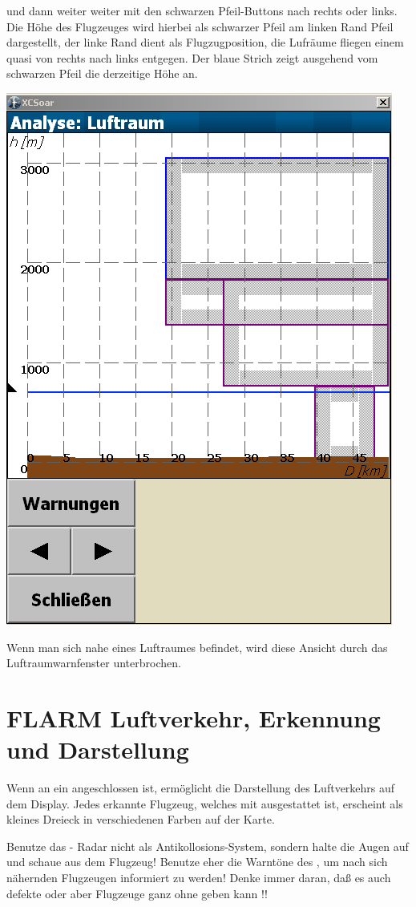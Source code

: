 und dann weiter weiter mit den schwarzen Pfeil-Buttons  nach rechts oder links.
Die Höhe des Flugzeuges wird hierbei als schwarzer Pfeil am linken Rand Pfeil dargestellt, der linke
Rand dient als Flugzugposition, die Lufräume fliegen einem quasi von rechts nach links entgegen.
Der blaue Strich zeigt ausgehend vom schwarzen Pfeil die derzeitige Höhe an.

\begin{center}
\includegraphics[angle=0,width=0.7\linewidth,keepaspectratio='true']{figures/analysis-airspace.png}
\end{center}

Wenn man sich nahe eines Luftraumes befindet, wird diese Ansicht durch das
Luftraumwarnfenster unterbrochen.


\section{FLARM Luftverkehr, Erkennung und Darstellung}
Wenn \xc an ein \fl angeschlossen ist, ermöglicht \xc die Darstellung
des Luftverkehrs auf dem Display. Jedes erkannte Flugzeug, welches mit \fl
ausgestattet ist,  erscheint als kleines Dreieck in verschiedenen Farben  auf der Karte.

\achtung Benutze das \xc \fl- Radar nicht als Antikollosions-System, sondern halte die Augen auf und schaue
aus dem Flugzeug! Benutze eher die Warntöne des \fl , um nach sich nähernden Flugzeugen informiert zu werden!
Denke immer daran, daß es auch defekte \fl oder aber Flugzeuge ganz ohne \fl geben kann !!

